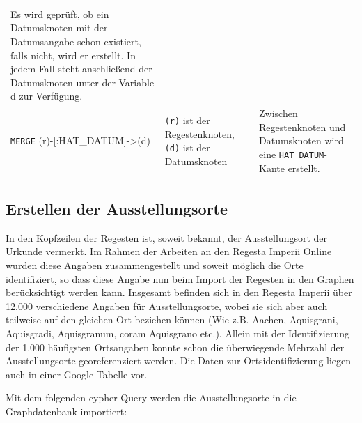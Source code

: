 \documentclass[ngerman,]{scrreprt}
\begin{document}
\begin{longtable}[]{@{}lll@{}}
\begin{minipage}[t]{0.37\columnwidth}
Es wird geprüft, ob ein Datumsknoten mit der Datumsangabe schon existiert, falls nicht, wird er erstellt. In jedem Fall steht anschließend der Datumsknoten unter der Variable d zur Verfügung.\strut
\end{minipage}\tabularnewline
\begin{minipage}[t]{0.31\columnwidth}\raggedright\strut
\texttt{MERGE} (r)-{[}:HAT\_DATUM{]}-\textgreater{}(d)\strut
\end{minipage} & \begin{minipage}[t]{0.23\columnwidth}\raggedright\strut
\texttt{(r)} ist der Regestenknoten, \texttt{(d)} ist der Datumsknoten\strut
\end{minipage} & \begin{minipage}[t]{0.37\columnwidth}\raggedright\strut
Zwischen Regestenknoten und Datumsknoten wird eine \texttt{HAT\_DATUM}-Kante erstellt.\strut
\end{minipage}\tabularnewline
\bottomrule
\end{longtable}

\subsection{Erstellen der Ausstellungsorte}\label{erstellen-der-ausstellungsorte}

In den Kopfzeilen der Regesten ist, soweit bekannt, der Ausstellungsort der Urkunde vermerkt. Im Rahmen der Arbeiten an den Regesta Imperii Online wurden diese Angaben zusammengestellt und soweit möglich die Orte identifiziert, so dass diese Angabe nun beim Import der Regesten in den Graphen berücksichtigt werden kann. Insgesamt befinden sich in den Regesta Imperii über 12.000 verschiedene Angaben für Ausstellungsorte, wobei sie sich aber auch teilweise auf den gleichen Ort beziehen können (Wie z.B. Aachen, Aquisgrani, Aquisgradi, Aquisgranum, coram Aquisgrano etc.). Allein mit der Identifizierung der 1.000 häufigsten Ortsangaben konnte schon die überwiegende Mehrzahl der Ausstellungsorte georeferenziert werden. Die Daten zur Ortsidentifizierung liegen auch in einer Google-Tabelle vor.

Mit dem folgenden cypher-Query werden die Ausstellungsorte in die Graphdatenbank importiert:
\end{document}
